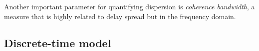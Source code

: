 Another important parameter for quantifying dispersion is \emph{coherence bandwidth}, a measure that is highly related to delay spread but in the frequency domain. %
\skelpar[3]

% 
% 

\subsection{Discrete-time model} \label{sec:discrete-time-model}


